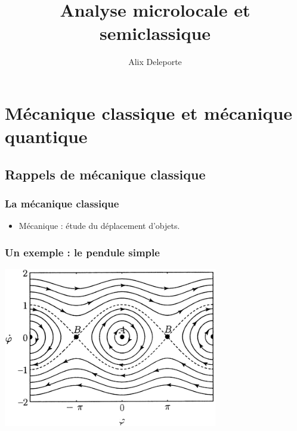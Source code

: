 \documentclass[mathserif]{beamer}
\title{Analyse microlocale et semiclassique}
\author[Alix Deleporte]{Alix Deleporte}
\institute[IRMA]{Institut de Recherche Mathématique Avancée\\Strasbourg}
\begin{document}
\begin{frame}
	\titlepage
      \end{frame}

      \section{Mécanique classique et mécanique quantique}

      \subsection{Rappels de mécanique classique}

      \begin{frame}
        \frametitle{La mécanique classique}
        \begin{itemize}
        \item Mécanique : étude du déplacement d'objets.
        \end{itemize}
      \end{frame}

      \begin{frame}
        \frametitle{Un exemple : le pendule simple}
        \begin{center}
          \includegraphics[width=0.7\textwidth]{pendulum.png}
        \end{center}
      \end{frame}
\end{document}
